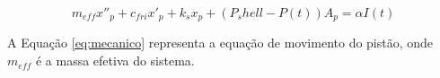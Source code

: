 \begin{equation}\label{eq:mecanico}
m_{eff}x''_p + c_{fri}x'_p+ k_{s}x_p + (P_shell - P(t))A_p = \alpha I(t) 
\end{equation}

A Equação \ref{eq:mecanico} representa a equação de movimento do pistão, onde $m_{eff}$ é a massa efetiva do sistema.










